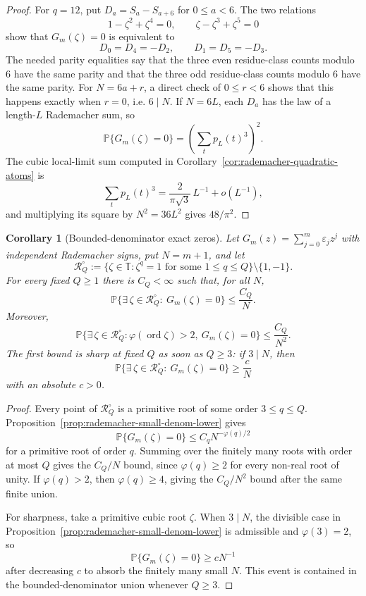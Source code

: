 \documentclass[11pt]{amsart}
\numberwithin{equation}{section}
\newtheorem{corollary}[theorem]{Corollary}
\theoremstyle{definition}
\theoremstyle{remark}
\newcommand{\T}{\mathbb T}
\newcommand{\Prob}{\mathbb P}
\begin{document}
\begin{proof}
For \(q=12\), put \(D_a=S_a-S_{a+6}\) for \(0\le a<6\).  The two relations
\[
  1-\zeta^2+\zeta^4=0,\qquad
  \zeta-\zeta^3+\zeta^5=0
\]
show that \(G_m(\zeta)=0\) is equivalent to
\[
  D_0=D_4=-D_2,\qquad D_1=D_5=-D_3 .
\]
The needed parity equalities say that the three even residue-class counts
modulo \(6\) have the same parity and that the three odd residue-class counts
modulo \(6\) have the same parity.  For \(N=6a+r\), a direct check of
\(0\le r<6\) shows that this happens exactly when \(r=0\), i.e. \(6\mid N\).
If \(N=6L\), each \(D_a\) has the law of a length-\(L\) Rademacher sum, so
\[
  \Prob\{G_m(\zeta)=0\}
  =\left(\sum_t p_L(t)^3\right)^2.
\]
The cubic local-limit sum computed in
Corollary~\ref{cor:rademacher-quadratic-atoms} is
\[
  \sum_t p_L(t)^3=\frac{2}{\pi\sqrt3}\,L^{-1}+o(L^{-1}),
\]
and multiplying its square by \(N^2=36L^2\) gives \(48/\pi^2\).
\end{proof}

\begin{corollary}[Bounded-denominator exact zeros]
\label{cor:rademacher-denom-zero}
Let \(G_m(z)=\sum_{j=0}^m\varepsilon_jz^j\) with independent Rademacher signs,
put \(N=m+1\), and let
\[
  \mathcal R_Q^\circ:=
  \{\zeta\in\T:\zeta^q=1\text{ for some }1\le q\le Q\}
  \setminus\{1,-1\}.
\]
For every fixed \(Q\ge1\) there is \(C_Q<\infty\) such that, for all \(N\),
\[
  \Prob\{\exists\,\zeta\in\mathcal R_Q^\circ:\ G_m(\zeta)=0\}
  \le \frac{C_Q}{N}.
\]
Moreover,
\[
  \Prob\{\exists\,\zeta\in\mathcal R_Q^\circ:
    \varphi(\operatorname{ord}\zeta)>2,\ G_m(\zeta)=0\}
  \le \frac{C_Q}{N^2}.
\]
The first bound is sharp at fixed \(Q\) as soon as \(Q\ge3\): if \(3\mid N\),
then
\[
  \Prob\{\exists\,\zeta\in\mathcal R_Q^\circ:\ G_m(\zeta)=0\}
  \ge \frac{c}{N}
\]
with an absolute \(c>0\).
\end{corollary}

\begin{proof}
Every point of \(\mathcal R_Q^\circ\) is a primitive root of some order
\(3\le q\le Q\).  Proposition~\ref{prop:rademacher-small-denom-lower} gives
\[
  \Prob\{G_m(\zeta)=0\}\le C_q N^{-\varphi(q)/2}
\]
for a primitive root of order \(q\).  Summing over the finitely many roots with
order at most \(Q\) gives the \(C_Q/N\) bound, since
\(\varphi(q)\ge2\) for every non-real root of unity.  If
\(\varphi(q)>2\), then \(\varphi(q)\ge4\), giving the \(C_Q/N^2\) bound after
the same finite union.

For sharpness, take a primitive cubic root \(\zeta\).  When \(3\mid N\), the
divisible case in Proposition~\ref{prop:rademacher-small-denom-lower} is
admissible and \(\varphi(3)=2\), so
\[
  \Prob\{G_m(\zeta)=0\}\ge cN^{-1}
\]
after decreasing \(c\) to absorb the finitely many small \(N\).  This event is
contained in the bounded-denominator union whenever \(Q\ge3\).
\end{proof}
\end{document}
